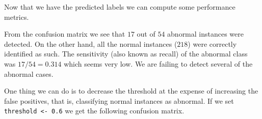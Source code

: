 \documentclass[
  11pt,
]{krantz}
\newenvironment{Shaded}{\begin{snugshade}}{\end{snugshade}}
\newcommand{\AttributeTok}[1]{\textcolor[rgb]{0.61,0.61,0.61}{#1}}
\newcommand{\CommentTok}[1]{\textcolor[rgb]{0.37,0.37,0.37}{\textit{#1}}}
\newcommand{\DecValTok}[1]{\textcolor[rgb]{0.06,0.06,0.06}{#1}}
\newcommand{\FunctionTok}[1]{\textcolor[rgb]{0,0,0}{#1}}
\newcommand{\NormalTok}[1]{#1}
\newcommand{\OtherTok}[1]{\textcolor[rgb]{0.37,0.37,0.37}{#1}}
\newcommand{\SpecialCharTok}[1]{\textcolor[rgb]{0,0,0}{#1}}
\newcommand{\StringTok}[1]{\textcolor[rgb]{0.5,0.5,0.5}{#1}}
\begin{document}
Now that we have the predicted labels we can compute some performance metrics.

\begin{Shaded}
\end{Shaded}

From the confusion matrix we see that \(17\) out of \(54\) abnormal instances were detected. On the other hand, all the normal instances (\(218\)) were correctly identified as such. The sensitivity (also known as recall) of the abnormal class was \(17/54=0.314\) which seems very low. We are failing to detect several of the abnormal cases.

One thing we can do is to decrease the threshold at the expense of increasing the false positives, that is, classifying normal instances as abnormal. If we set \texttt{threshold\ \textless{}-\ 0.6} we get the following confusion matrix.
\end{document}
